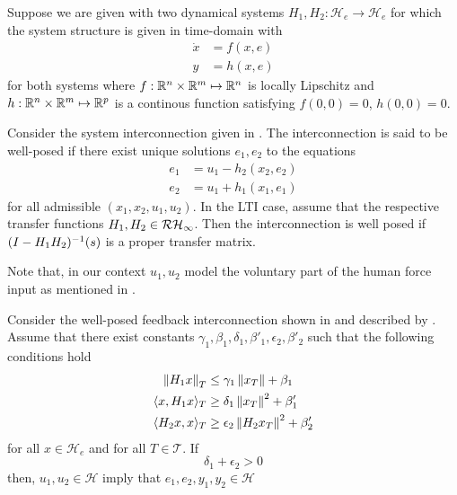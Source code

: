 Suppose we are given with two dynamical systems $H_1,H_2: \mathcal{H}_e\to\mathcal{H}_e$ for which the system structure is given in time-domain with 
\begin{align}
\dot{x} &= f(x,e)\\
y &= h(x,e)
\end{align}
for both systems where $f: \mathbb{R}^n\times\mathbb{R}^m\mapsto \mathbb{R}^n$ is locally Lipschitz and $h: \mathbb{R}^n\times\mathbb{R}^m\mapsto \mathbb{R}^p$
is a continous function satisfying $f(0,0)=0$, $h(0,0)=0$. 

\begin{define} Consider the system interconnection given in . The interconnection is said to 
be well-posed if there exist unique solutions $e_1,e_2$ to the equations
\begin{align}\label{eq:apdx:passint1}
e_1 &= u_1-h_2(x_2,e_2)\\\label{eq:apdx:passint2}
e_2 &= u_1+h_1(x_1,e_1)
\end{align}
for all admissible $(x_1,x_2,u_1,u_2)$. In the LTI case, assume that the respective transfer functions $H_1,H_2\in\mathcal{RH}_\infty$. Then
the interconnection is well posed if $(I-H_1H_2)^{-1}(s)$ is a proper transfer matrix.
\end{define}

Note that, in our context $u_1,u_2$ model the voluntary part of the human force input as mentioned in . 



\begin{thm}Consider the well-posed feedback interconnection shown in  and 
described by . Assume that there exist constants $\gamma_1,\beta_1,
\delta_1,\beta'_1,\epsilon_2,\beta'_2$ such that the following conditions hold
\begin{align}
\displaystyle \left\| H_1x \right\|_T &\leq \gamma_1\displaystyle \left\| x_T \right\|+\beta_1\\
\langle x,H_1x\rangle_T &\geq \delta_1\displaystyle \left\| x_T \right\|^2+\beta'_1\\
\langle H_2x,x\rangle_T &\geq \epsilon_2\displaystyle \left\| H_2x_T \right\|^2+\beta'_2
\end{align}
for all $x\in\mathcal{H}_e$ and for all $T\in\mathcal{T}$. If 
\begin{equation}
\delta_1+\epsilon_2 >0
\label{eq:apdx:actpas}
\end{equation}
then, $u_1,u_2 \in \mathcal{H}$ imply that $e_1,e_2,y_1,y_2\in\mathcal{H}$ 
\end{thm}

